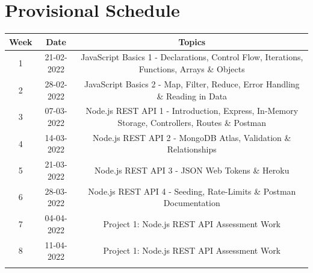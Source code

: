 \documentclass{article}
\begin{document}
\section*{Provisional Schedule}

\renewcommand{\arraystretch}{1.5}
\begin{tabular}{|c|c|c|c|}
	\hline
	\textbf{Week}    & \textbf{Date}            & \multicolumn{2}{c|}{\textbf{Topics}}                                                                                             \\ \hline
	\footnotesize 1  & \footnotesize 21-02-2022 & \multicolumn{2}{c|}{\footnotesize JavaScript Basics 1 - Declarations, Control Flow, Iterations, Functions, Arrays \& Objects}    \\ \hline
	\footnotesize 2  & \footnotesize 28-02-2022 & \multicolumn{2}{c|}{\footnotesize JavaScript Basics 2 - Map, Filter, Reduce, Error Handling \& Reading in Data}                  \\ \hline
	\footnotesize 3  & \footnotesize 07-03-2022 & \multicolumn{2}{c|}{\footnotesize Node.js REST API 1 - Introduction, Express, In-Memory Storage, Controllers, Routes \& Postman} \\ \hline
	\footnotesize 4  & \footnotesize 14-03-2022 & \multicolumn{2}{c|}{\footnotesize Node.js REST API 2 - MongoDB Atlas, Validation \& Relationships}                               \\ \hline
	\footnotesize 5  & \footnotesize 21-03-2022 & \multicolumn{2}{c|}{\footnotesize Node.js REST API 3 - JSON Web Tokens \& Heroku}                                                \\ \hline
	\footnotesize 6  & \footnotesize 28-03-2022 & \multicolumn{2}{c|}{\footnotesize Node.js REST API 4 - Seeding, Rate-Limits \& Postman Documentation}                           \\ \hline
	\footnotesize 7  & \footnotesize 04-04-2022 & \multicolumn{2}{c|}{\footnotesize Project 1: Node.js REST API Assessment Work}                                                   \\ \hline
	\footnotesize 8  & \footnotesize 11-04-2022 & \multicolumn{2}{c|}{\footnotesize Project 1: Node.js REST API Assessment Work}                                                   \\ \hline
	\rowcolor{yellow} \multicolumn{4}{|c|}{\footnotesize Mid Term Break}                                                                                                           \\ \hline

\end{tabular}
\end{document}
